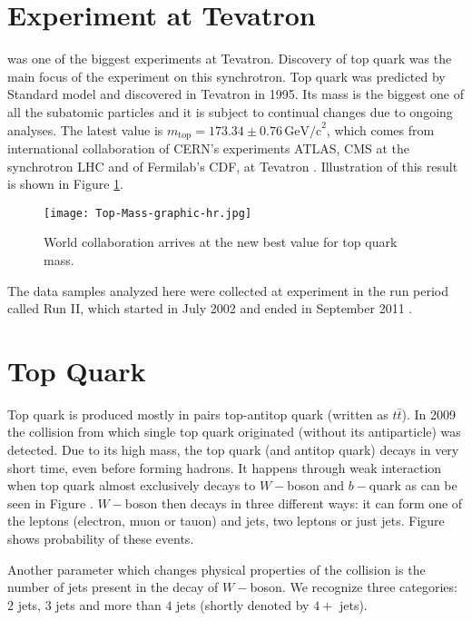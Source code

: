 \section{\texorpdfstring{\dzero}{D0} Experiment at Tevatron}
\dzero was one of the biggest experiments at Tevatron. Discovery of top quark was the main focus of the \dzero experiment on this synchrotron. Top quark was predicted by Standard model and discovered in Tevatron in 1995. Its mass is the biggest one of all the subatomic particles and it is subject to continual changes due to ongoing analyses. The latest value is $m_\mathrm{top} = 173.34 \pm 0.76 \,\mathrm{GeV/c}^2 $, which comes from international collaboration of CERN's experiments ATLAS, CMS at the synchrotron LHC and of Fermilab's CDF, \dzero at Tevatron \cite{jointMass}. Illustration of this result is shown in Figure \ref{fig:jointMass}. 

\begin{figure}[h]
	\centering
	\texttt{[image: Top-Mass-graphic-hr.jpg]}
	\caption{World collaboration arrives at the new best value for top quark mass.}
	\label{fig:jointMass}
\end{figure}

The data samples analyzed here were collected at \dzero experiment in the run period called Run II, which started in July 2002 and ended in September 2011 \cite{Yuntse}.

\section{Top Quark} \label{sec:topQuark}
Top quark is produced mostly in pairs top-antitop quark (written as $t\bar{t}$). In 2009 the collision from which single top quark originated  (without its antiparticle) was detected. Due to its high mass, the top quark (and antitop quark) decays in very short time, even before forming hadrons. It happens through weak interaction when top quark almost exclusively decays to $W-$boson and $b-$quark as can be seen in Figure . $W-$boson then decays in three different ways: it can form one of the leptons (electron, muon or tauon) and jets, two leptons or just jets. Figure  shows probability of these events. 

Another parameter which changes physical properties of the collision is the number of jets present in the decay of $W-$boson. We recognize three categories: $2$ jets, $3$ jets and more than $4$ jets (shortly denoted by $4+$ jets).

